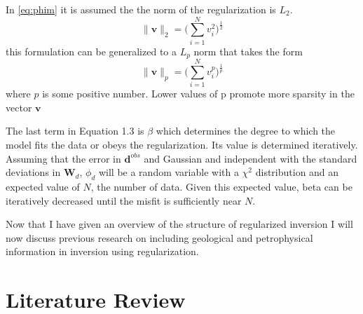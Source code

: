 In \autoref{eq:phim} it is assumed the the norm of the regularization is $L_2$. 
\begin{equation}
\|\mathbf v\|_2 = \Big(\sum_{i=1}^N v_i^2\Big)^{\frac{1}{2}}
\end{equation}
this formulation can be generalized to a $L_p$ norm that takes the form
\begin{equation}
\|\mathbf v\|_p = \Big(\sum_{i=1}^N v_i^p\Big)^{\frac{1}{p}}
\end{equation}
where $p$ is some positive number. Lower values of p promote more sparsity in the vector $\mathbf v$

The last term in Equation 1.3 is $\beta$ which determines the degree to which the model fits the data or obeys the regularization. Its value is determined iteratively. Assuming that the error in $\mathbf d^{obs}$ and Gaussian  and  independent with the standard deviations in $\mathbf W_d$, $\phi_d$ will be a random variable with a $\chi^2$ distribution and an expected value of $N$, the number of data. Given this expected value, beta can be iteratively decreased until the misfit is sufficiently near $N$.

Now that I have given an overview of the structure of regularized inversion I will now discuss previous research on including geological and petrophysical information in inversion using regularization.

\section{Literature Review}
\label{sec:Literature Review}

